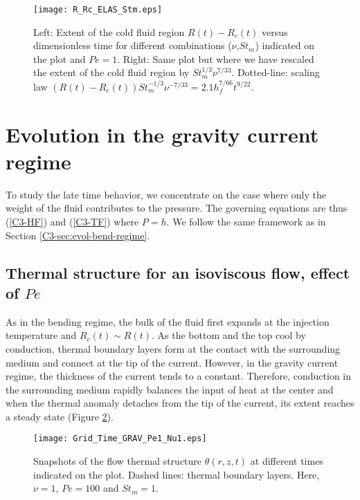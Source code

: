 \begin{figure}[h!]
  \begin{center}
    \graphicspath{ {/Users/thorey/Documents/These/Projet/Refroidissement/Skin_Model/Figure/JFM_V13/} }
    \texttt{[image: R\_Rc\_ELAS\_Stm.eps]}
    \caption{Left:  Extent  of  the cold  fluid  region  $R(t)-R_c(t)$
      versus   dimensionless    time   for    different   combinations
      ($\nu$,$St_m$) indicated  on the  plot and $Pe=1$.   Right: Same
      plot but  where we have  rescaled the  extent of the  cold fluid
      region  by  $St_m^{1/3}\nu^{7/33}$.   Dotted-line:  scaling  law
      $(R(t)-R_c(t))St_m^{-1/3}\nu^{-7/33}= 2.1 h_f^{7/66}t^{9/22}$.}
    \label{C3-R_Rc_ELAS_Stm}
  \end{center}
\end{figure}


\section{Evolution in the gravity current regime}
\label{C3-sec:evol-grav-curr-1}

To study the late time behavior, we concentrate on the case where only
the weight  of the fluid  contributes to the pressure.   The governing
equations are  thus (\ref{C3-HF})  and (\ref{C3-TF}) where  $P=h$.  We
follow the same framework as in Section \ref{C3-sec:evol-bend-regime}.

\subsection{Thermal structure for an isoviscous flow, effect of $Pe$}
\label{C3-sec:thermal-structure-an-1}
  
As in the bending  regime, the bulk of the fluid  first expands at the
injection temperature and  $R_c(t) \sim R(t)$.  As the  bottom and the
top cool  by conduction, thermal  boundary layers form at  the contact
with  the   surrounding  medium  and   connect  at  the  tip   of  the
current. However, in the gravity  current regime, the thickness of the
current tends to a constant.  Therefore, conduction in the surrounding
medium rapidly balances  the input of heat at the  center and when the
thermal  anomaly detaches  from the  tip  of the  current, its  extent
reaches a steady state (Figure \ref{C3-Grid_Time_GRAV}).

\begin{figure}[h!]
  \begin{center}
    \graphicspath{ {/Users/thorey/Documents/These/Projet/Refroidissement/Skin_Model/Figure/JFM_V13/} }
    \texttt{[image: Grid\_Time\_GRAV\_Pe1\_Nu1.eps]}
    \caption{Snapshots of  the flow thermal  structure $\theta(r,z,t)$
      at different times indicated on the plot.  Dashed lines: thermal
      boundary layers.  Here, $\nu=1$, $Pe =100$ and $St_m = 1$.}
    \label{C3-Grid_Time_GRAV}
  \end{center}
\end{figure}

